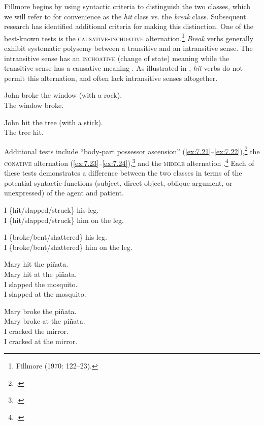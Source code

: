 Fillmore begins by using syntactic criteria to distinguish the two classes, which we will refer to for convenience as the \textit{hit} class vs. the \textit{break} class. Subsequent research has identified additional criteria for making this distinction. One of the best-known tests is the \textsc{causative-inchoative} alternation.\footnote{Fillmore (1970: 122–23).} \textit{Break} verbs generally exhibit systematic polysemy between a transitive and an intransitive sense. The intransitive sense has an \textsc{inchoative} (change of state) meaning while the transitive sense has a causative meaning . As illustrated in , \textit{hit} verbs do not permit this alternation, and often lack intransitive senses altogether.


\ea \label{ex:7.19}
\ea  John broke the window (with a rock).\\
\ex  The window broke.
                       \z
\z

\ea \label{ex:7.20}
\ea  John hit the tree (with a stick).\\
\ex *The tree hit.
                       \z
\z


Additional tests include “body-part possessor ascension” (\ref{ex:7.21}--\ref{ex:7.22}),\footnote{\citet[126]{Fillmore1970}.} the \textsc{conative} alternation (\ref{ex:7.23}--\ref{ex:7.24}),\footnote{\citet{GuersselEtAl1985,Levin1993}.} and the \textsc{middle} alternation .\footnote{\citet{Fillmore1977,HaleKeyser1987,Levin1993}.} Each of these tests demonstrates a difference between the two classes in terms of the potential syntactic functions (subject, direct object, oblique argument, or unexpressed) of the agent and patient.


\ea \label{ex:7.21}
\ea  I \{hit/slapped/struck\} his leg.\\
\ex  I \{hit/slapped/struck\} him on the leg.
                       \z
\z

\ea \label{ex:7.22}
\ea  I \{broke/bent/shattered\} his leg.\\
\ex *I \{broke/bent/shattered\} him on the leg.
                       \z
\z

\ea \label{ex:7.23}
\ea  Mary hit the piñata.\\
\ex  Mary hit at the piñata.\\
\ex  I slapped the mosquito.\\
\ex  I slapped at the mosquito.
                       \z
\z

\ea \label{ex:7.24}
\ea  Mary broke the piñata.\\
\ex  *Mary broke at the piñata.\\
\ex  I cracked the mirror.\\
\ex  *I cracked at the mirror.
                       \z
\z


